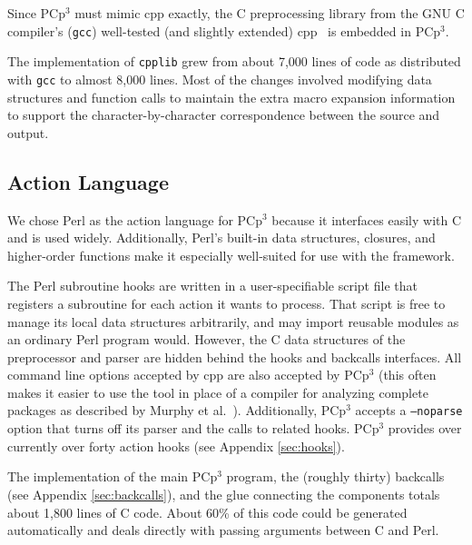 \documentclass{article}
\newcommand{\pcp}{\mbox{\textsf{PCp}$^3$}}
\newcommand{\Cpp}{\mbox{\textsf{cpp}}}
\newcommand{\Perl}{\mbox{Perl}}
\newcommand{\C}{\mbox{C}}
\begin{document}
Since \pcp{} must mimic \Cpp{} exactly, the \C{}
preprocessing library from the GNU \C{} compiler's (\texttt{gcc})
well-tested (and slightly extended) \Cpp{}~\cite{GCC} is embedded in
\pcp{}.  


The implementation of \texttt{cpplib} grew from about 7,000 lines of
code as distributed with \texttt{gcc} to almost 8,000 lines.  Most of
the changes involved modifying data structures and function calls to
maintain the extra macro expansion information to support the
character-by-character correspondence between the source and output.

\subsection{Action Language}
\label{sec:perl_action_lang}

\nopagebreak

We chose \Perl{} as the action language for \pcp{} because it interfaces
easily with \C{} and is used widely.  Additionally, \Perl{}'s built-in
data structures, closures, and higher-order functions make it especially 
well-suited for use with the framework.

The \Perl{} subroutine hooks are written in a user-specifiable script
file that registers a subroutine for each action it wants to process.
That script is free to manage its local data structures arbitrarily, and
may import reusable modules as an ordinary \Perl{} program would.  However, the
\C{} data structures of the preprocessor and parser are hidden behind
the hooks and backcalls interfaces. All command line options accepted by
\Cpp{} are also accepted by \pcp{} (this often makes it easier to use
the tool in place of a compiler for analyzing complete packages as
described by Murphy et al.~\cite{Murphy98}).  Additionally, \pcp{}
accepts a \texttt{--noparse} option that turns off its parser and the
calls to related hooks.  \pcp{} provides over currently over forty action
hooks (see Appendix \ref{sec:hooks}).

The implementation of the main \pcp{} program, the (roughly thirty)
backcalls (see Appendix \ref{sec:backcalls}),
and the glue connecting the components totals about 1,800
lines of \C{} code.  About 60\% of this code could be generated automatically
and deals directly with passing
arguments between \C{} and \Perl{}.
\end{document}
